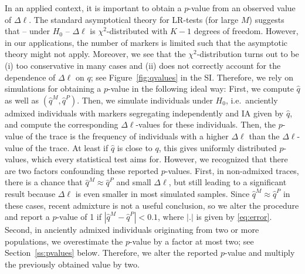 \documentclass[12pt]{article}
\theoremstyle{definition}
\begin{document}
{\color{blue} In an applied context, it is important to obtain a $p$-value from an observed value of $\Delta\ell$. The standard asymptotical theory  for LR-tests (for large $M$) suggests that -- under $H_0$ -- $\Delta\ell$ is $\chi^2$-distributed with $K-1$
degrees of freedom. However, in our applications, the number of markers is limited such that the asymptotic theory might not apply. Moreover, we see that the $\chi^2$-distribution turns out to be (i) too conservative in many cases and (ii) does not correctly account for the dependence of $\Delta\ell$ on $q$; see Figure~\ref{fig:qvalues} in the SI. Therefore,  we rely on simulations for obtaining a $p$-value in the following ideal way: First, we compute $\hat q$ as well as $(\hat q^M, \hat q^P)$. Then, we simulate individuals under $H_0$, i.e.\ anciently admixed individuals with markers segregating independently and IA given by $\hat q$, and compute the corresponding $\Delta\ell$-values for these individuals. Then, the $p$-value of the trace is the frequency of individuals with a higher $\Delta\ell$ than the $\Delta\ell$-value of the trace. At least if $\hat q$ is close to $q$, this gives uniformly distributed $p$-values, which every statistical test aims for. However, we recognized that there are two factors confounding these reported $p$-values. First, in non-admixed traces, there is a chance that $\hat q^M \approx \hat q^P$ and small $\Delta\ell$, but still leading to a significant result because $\Delta\ell$ is even smaller in most simulated samples. Since $\hat q^M \approx \hat q^P$ in these cases, recent admixture is not a useful conclusion, so we alter the procedure and report a $p$-value of 1 if $|\hat q^M - \hat q^P| < 0.1$, where $|.|$ is given by \eqref{eq:error}. Second, in anciently admixed individuals originating from two or more populations, we overestimate the $p$-value by a factor at most two; see Section~\ref{ss:pvalues} below. Therefore, we alter the reported $p$-value and multiply the previously obtained value by two.}
\end{document}
